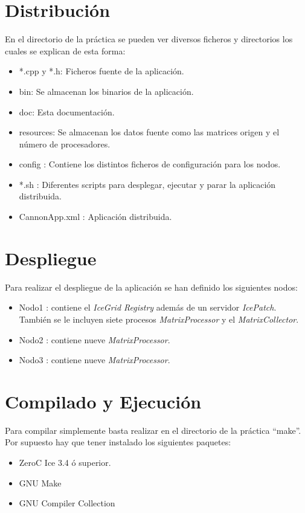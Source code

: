 

\section{Distribución}

En el directorio de la práctica se pueden ver diversos ficheros y directorios los cuales se explican de esta forma:

\begin{itemize}
\item *.cpp y *.h: Ficheros fuente de la aplicación.
\item bin: Se almacenan los binarios de la aplicación.
\item doc: Esta documentación.
\item resources: Se almacenan los datos fuente como las matrices origen y el número de procesadores.
\item config : Contiene los distintos ficheros de configuración para los nodos.
\item *.sh : Diferentes scripts para desplegar, ejecutar y parar la aplicación distribuida.
\item CannonApp.xml : Aplicación distribuida.
\end{itemize}

\section{Despliegue}

Para realizar el despliegue de la aplicación se han definido los siguientes nodos:
\begin{itemize}

\item Nodo1 : contiene el \emph{IceGrid Registry} además de un servidor \emph{IcePatch}. También se le incluyen siete procesos \emph{MatrixProcessor} y el \emph{MatrixCollector}.
\item Nodo2 : contiene nueve \emph{MatrixProcessor}.
\item Nodo3 : contiene nueve \emph{MatrixProcessor}.
\end{itemize}



\section{Compilado y Ejecución}

Para compilar simplemente basta realizar en el directorio de la práctica ``make''.
Por supuesto hay que tener instalado los siguientes paquetes:
\begin{itemize}
\item ZeroC Ice 3.4 ó superior.
\item GNU Make
\item GNU Compiler Collection
\end{itemize}

